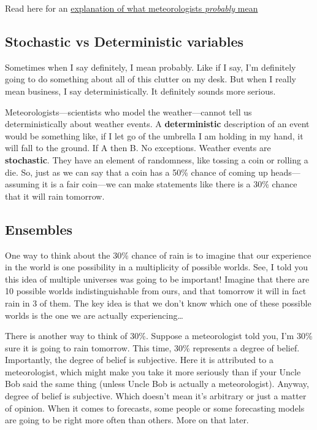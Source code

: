 \documentclass[]{book}
\begin{document}
Read here for an \href{http://wxbrad.com/why-a-50-chance-of-rain-usually-means-a-100-chance-of-confusion/}{explanation of what meteorologists \emph{probably} mean}

\hypertarget{stochastic-vs-deterministic-variables}{%
\subsection{Stochastic vs Deterministic variables}\label{stochastic-vs-deterministic-variables}}

Sometimes when I say definitely, I mean probably. Like if I say, I'm definitely going to do something about all of this clutter on my desk. But when I really mean business, I say deterministically. It definitely sounds more serious.

Meteorologists---scientists who model the weather---cannot tell us deterministically about weather events. A \textbf{deterministic} description of an event would be something like, if I let go of the umbrella I am holding in my hand, it will fall to the ground. If A then B. No exceptions. Weather events are \textbf{stochastic}. They have an element of randomness, like tossing a coin or rolling a die. So, just as we can say that a coin has a 50\% chance of coming up heads---assuming it is a fair coin---we can make statements like there is a 30\% chance that it will rain tomorrow.

\hypertarget{ensembles}{%
\subsection{Ensembles}\label{ensembles}}

One way to think about the 30\% chance of rain is to imagine that our experience in the world is one possibility in a multiplicity of possible worlds. See, I told you this idea of multiple universes was going to be important! Imagine that there are 10 possible worlds indistinguishable from ours, and that tomorrow it will in fact rain in 3 of them. The key idea is that we don't know which one of these possible worlds is the one we are actually experiencing\ldots{}

There is another way to think of 30\%. Suppose a meteorologist told you, I'm 30\% sure it is going to rain tomorrow. This time, 30\% represents a degree of belief. Importantly, the degree of belief is subjective. Here it is attributed to a meteorologist, which might make you take it more seriously than if your Uncle Bob said the same thing (unless Uncle Bob is actually a meteorologist). Anyway, degree of belief is subjective. Which doesn't mean it's arbitrary or just a matter of opinion. When it comes to forecasts, some people or some forecasting models are going to be right more often than others. More on that later.
\end{document}

